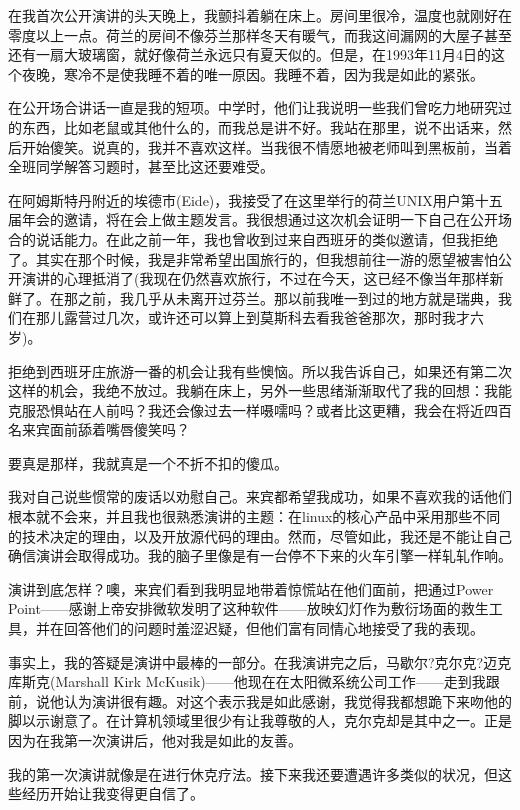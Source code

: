  

在我首次公开演讲的头天晚上，我颤抖着躺在床上。房间里很冷，温度也就刚好在零度以上一点。荷兰的房间不像芬兰那样冬天有暖气，而我这间漏网的大屋子甚至还有一扇大玻璃窗，就好像荷兰永远只有夏天似的。但是，在1993年11月4日的这个夜晚，寒冷不是使我睡不着的唯一原因。我睡不着，因为我是如此的紧张。

在公开场合讲话一直是我的短项。中学时，他们让我说明一些我们曾吃力地研究过的东西，比如老鼠或其他什么的，而我总是讲不好。我站在那里，说不出话来，然后开始傻笑。说真的，我并不喜欢这样。当我很不情愿地被老师叫到黑板前，当着全班同学解答习题时，甚至比这还要难受。

在阿姆斯特丹附近的埃德市(Eide)，我接受了在这里举行的荷兰UNIX用户第十五届年会的邀请，将在会上做主题发言。我很想通过这次机会证明一下自己在公开场合的说话能力。在此之前一年，我也曾收到过来自西班牙的类似邀请，但我拒绝了。其实在那个时候，我是非常希望出国旅行的，但我想前往一游的愿望被害怕公开演讲的心理抵消了(我现在仍然喜欢旅行，不过在今天，这已经不像当年那样新鲜了。在那之前，我几乎从未离开过芬兰。那以前我唯一到过的地方就是瑞典，我们在那儿露营过几次，或许还可以算上到莫斯科去看我爸爸那次，那时我才六岁)。

拒绝到西班牙庄旅游一番的机会让我有些懊恼。所以我告诉自己，如果还有第二次这样的机会，我绝不放过。我躺在床上，另外一些思绪渐渐取代了我的回想：我能克服恐惧站在人前吗？我还会像过去一样嗫嚅吗？或者比这更糟，我会在将近四百名来宾面前舔着嘴唇傻笑吗？

要真是那样，我就真是一个不折不扣的傻瓜。

我对自己说些惯常的废话以劝慰自己。来宾都希望我成功，如果不喜欢我的话他们根本就不会来，并且我也很熟悉演讲的主题：在linux的核心产品中采用那些不同的技术决定的理由，以及开放源代码的理由。然而，尽管如此，我还是不能让自己确信演讲会取得成功。我的脑子里像是有一台停不下来的火车引擎一样轧轧作响。

演讲到底怎样？噢，来宾们看到我明显地带着惊慌站在他们面前，把通过Power Point——感谢上帝安排微软发明了这种软件——放映幻灯作为敷衍场面的救生工具，并在回答他们的问题时羞涩迟疑，但他们富有同情心地接受了我的表现。

事实上，我的答疑是演讲中最棒的一部分。在我演讲完之后，马歇尔?克尔克?迈克库斯克(Marshall Kirk McKusik)——他现在在太阳微系统公司工作——走到我跟前，说他认为演讲很有趣。对这个表示我是如此感谢，我觉得我都想跪下来吻他的脚以示谢意了。在计算机领域里很少有让我尊敬的人，克尔克却是其中之一。正是因为在我第一次演讲后，他对我是如此的友善。

我的第一次演讲就像是在进行休克疗法。接下来我还要遭遇许多类似的状况，但这些经历开始让我变得更自信了。

